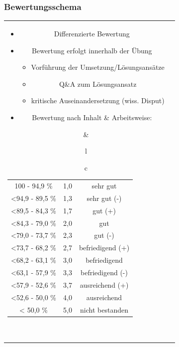 \documentclass[xcolor=dvipsnames,aspectratio=169]{beamer}
\begin{document}
\begin{frame}
	\frametitle{Bewertungsschema}
 \begin{tabular}{cc}
 \hspace*{-1.3cm} 
 \parbox{0.65\linewidth}{
\begin{itemize}
		\item Differenzierte Bewertung
		\item Bewertung erfolgt innerhalb der Übung
		\begin{itemize}
			\item Vorführung der Umsetzung/Lösungsansätze
			\item Q\&A zum Lösungsansatz
			\item kritische Auseinandersetzung (wiss. Disput)
		\end{itemize}
		\item Bewertung nach Inhalt \& Arbeitsweise:	
	\end{itemize} } 
& \begin{tabular}{l}
 \begin{tabular}{c}
 \hspace*{-1.7cm}
  \begin{tabular}{|c|c|c|}
\hline
100 - 94,9 \%   & 	1,0  &	sehr gut 		\\
<94,9 - 89,5 \% & 	1,3  &  sehr gut (-)		\\ \hline
<89,5 - 84,3 \% & 	1,7 &	gut (+)			\\
<84,3 - 79,0 \% &	2,0 	& 	gut				\\
<79,0 - 73,7 \% &	2,3 & 	gut (-)			\\ \hline
<73,7 - 68,2 \% & 	2,7 & 	befriedigend (+)	\\
<68,2 - 63,1 \% & 	3,0 	& 	befriedigend		\\
<63,1 - 57,9 \% & 	3,3 & 	befriedigend (-)	\\ \hline
<57,9 - 52,6 \% &	3,7 	& 	ausreichend (+)	\\
<52,6 - 50,0 \% & 	4,0 & 	ausreichend		\\ \hline
< 50,0 \%		&	5,0 & 	nicht bestanden \\ \hline
\end{tabular}         
           \end{tabular}
\end{tabular}\\
\end{tabular}
\end{frame}
\end{document}
